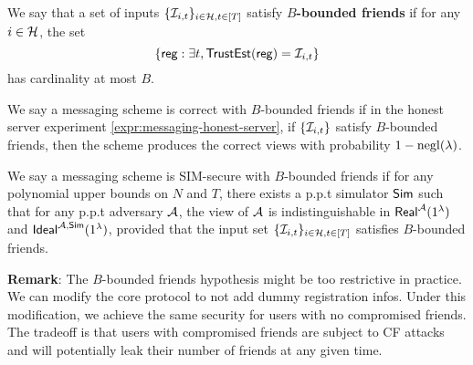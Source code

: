 
\begin{definition}
\label{defn:messaging-security-weaker}
We say that a set of inputs $\{\mathcal{I}_{i, t}\}_{i \in \mathcal{H}, t \in [T]}$ satisfy \textbf{$B$-bounded friends} if for any $i \in \mathcal{H}$, the set
$$\{\mathsf{reg}: \exists t, \mathsf{TrustEst}(\mathsf{reg}) = \mathcal{I}_{i, t}\}$$
has cardinality at most $B$.

We say a messaging scheme is correct with $B$-bounded friends if in the honest server experiment \cref{expr:messaging-honest-server}, if $\{\mathcal{I}_{i, t}\}$ satisfy $B$-bounded friends, then the scheme produces the correct views with probability $1 - \operatorname{negl}(\lambda)$.

We say a messaging scheme is SIM-secure with $B$-bounded friends if for any polynomial upper bounds on $N$ and $T$, there exists a p.p.t simulator $\mathsf{Sim}$ such that for any p.p.t adversary $\mathcal{A}$, the view of $\mathcal{A}$ is indistinguishable in $\mathsf{Real}^{\mathcal{A}}(1^{\lambda})$ and $\mathsf{Ideal}^{\mathcal{A}, \mathsf{\mathsf{Sim}}}(1^{\lambda})$, provided that the input set $\{\mathcal{I}_{i, t}\}_{i \in \mathcal{H}, t \in [T]}$ satisfies $B$-bounded friends.
\end{definition}

\textbf{Remark}: The $B$-bounded friends hypothesis might be too restrictive in practice. We can modify the core protocol to not add dummy registration infos. Under this modification, we achieve the same security for users with no compromised friends. The tradeoff is that users with compromised friends are subject to CF attacks and will potentially leak their number of friends at any given time.